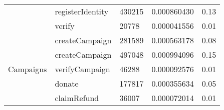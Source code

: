 \documentclass[../main-report.tex]{subfiles}
\begin{document}
\begin{table}[!ht]
\begin{tabular}{|l|l|l|l|l|}
                                        & registerIdentity                  & 430215                                                                                            & 0.000860430                                                                                       & 0.13                                                                                              \\ \cline{2-5} 
                                        & verify                            & 20778                                                                                             & 0.000041556                                                                                       & 0.01                                                                                              \\ \hline
\multirow{7}{*}{Campaigns}              & createCampaign                    & 281589                                                                                            & 0.000563178                                                                                       & 0.08                                                                                              \\ \cline{2-5} 
                                        & createCampaign                    & 497048                                                                                            & 0.000994096                                                                                       & 0.15                                                                                              \\ \cline{2-5} 
                                        & verifyCampaign                    & 46288                                                                                             & 0.000092576                                                                                       & 0.01                                                                                              \\ \cline{2-5} 
                                        & donate                            & 177817                                                                                            & 0.000355634                                                                                       & 0.05                                                                                              \\ \cline{2-5} 
                                        & claimRefund                       & 36007                                                                                             & 0.000072014                                                                                       & 0.01                                                                                              \\ \cline{2-5} 

\end{tabular}
\end{table}
\end{document}

